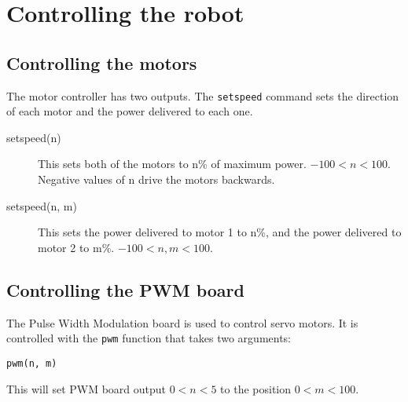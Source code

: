\documentclass{article}
\begin{document}
\section{Controlling the robot}
\subsection{Controlling the motors}
The motor controller has two outputs.  The \texttt{setspeed} command
sets the direction of each motor and the power delivered to each one.

\begin{description}
\item[setspeed(n)] This sets both of the motors to n\% of maximum
power.  $-100<n<100$. Negative values of n drive the motors backwards.
\item[setspeed(n, m)] This sets the power delivered to motor 1 to n\%,
  and the power delivered to motor 2 to m\%. $-100<n,m<100$.
\end{description}

\subsection{Controlling the PWM board}
The Pulse Width Modulation board is used to control servo motors.  It is
controlled with the \texttt{pwm} function that takes two arguments:

\begin{verbatim}
pwm(n, m)
\end{verbatim}

This will set PWM board output $0<n<5$ to the position $0<m<100$.
\end{document}
